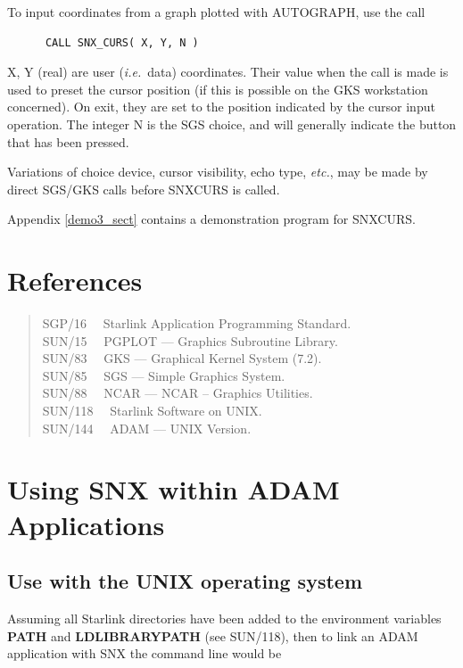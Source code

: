 \documentclass[twoside,11pt]{article}
\renewcommand{\_}{\texttt{\symbol{95}}}
\begin{document}
To input coordinates from a graph plotted with AUTOGRAPH, use the call

\begin{verbatim}
      CALL SNX_CURS( X, Y, N )
\end{verbatim}

X, Y (real) are user ({\em i.e.}\ data) coordinates.
Their value when the call is made is used to preset the cursor
position (if this is possible on the GKS workstation concerned).
On exit, they are set to the position indicated by the
cursor input operation.
The integer N is the SGS choice, and will generally indicate the button
that has been pressed.

Variations of choice device, cursor visibility, echo type,
{\em etc.}, may be made by direct SGS/GKS calls before SNX\_CURS is called.

Appendix \ref{demo3_sect} contains a demonstration program for SNX\_CURS.


\section {References}

\begin{verse}
SGP/16 ~~Starlink Application Programming Standard.\\
SUN/15 ~~PGPLOT --- Graphics Subroutine Library.\\
SUN/83 ~~GKS --- Graphical Kernel System (7.2).\\
SUN/85 ~~SGS --- Simple Graphics System.\\
SUN/88 ~~NCAR --- NCAR -- Graphics Utilities.\\
SUN/118 ~~Starlink Software on UNIX.\\
SUN/144 ~~ADAM --- UNIX Version.
\end{verse}


\newpage
\appendix
\section {Using SNX within ADAM Applications} \label{adam_link}

\subsection {Use with the UNIX operating system}

\begin{sloppypar}
Assuming all Starlink directories have been added to the environment variables
{\bf PATH} and {\bf LD\_LIBRARY\_PATH} (see SUN/118), then to link an ADAM
application with SNX the command line would be
\end{sloppypar}
\end{document}
